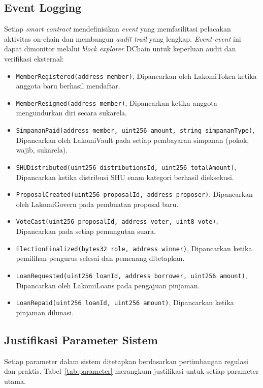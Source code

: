 \subsection{Event Logging}

Setiap \textit{smart contract} mendefinisikan \textit{event} yang memfasilitasi pelacakan aktivitas on-chain dan membangun \textit{audit trail} yang lengkap. \textit{Event-event} ini dapat dimonitor melalui \textit{block explorer} DChain untuk keperluan audit dan verifikasi eksternal:

\begin{itemize}
	\item \texttt{MemberRegistered(address member)}, Dipancarkan oleh LakomiToken ketika anggota baru berhasil mendaftar.
	\item \texttt{MemberResigned(address member)}, Dipancarkan ketika anggota mengundurkan diri secara sukarela.
	\item \texttt{SimpananPaid(address member, uint256 amount, string simpananType)}, Dipancarkan oleh LakomiVault pada setiap pembayaran simpanan (pokok, wajib, sukarela).
	\item \texttt{SHUDistributed(uint256 distributionsId, uint256 totalAmount)}, Dipancarkan ketika distribusi SHU enam kategori berhasil dieksekusi.
	\item \texttt{ProposalCreated(uint256 proposalId, address proposer)}, Dipancarkan oleh LakomiGovern pada pembuatan proposal baru.
	\item \texttt{VoteCast(uint256 proposalId, address voter, uint8 vote)}, Dipancarkan pada setiap pemungutan suara.
	\item \texttt{ElectionFinalized(bytes32 role, address winner)}, Dipancarkan ketika pemilihan pengurus selesai dan pemenang ditetapkan.
	\item \texttt{LoanRequested(uint256 loanId, address borrower, uint256 amount)}, Dipancarkan oleh LakomiLoans pada pengajuan pinjaman.
	\item \texttt{LoanRepaid(uint256 loanId, uint256 amount)}, Dipancarkan ketika pinjaman dilunasi.
\end{itemize}

\subsection{Justifikasi Parameter Sistem}

Setiap parameter dalam sistem ditetapkan berdasarkan pertimbangan regulasi dan praktis. Tabel~\ref{tab:parameter} merangkum justifikasi untuk setiap parameter utama.

